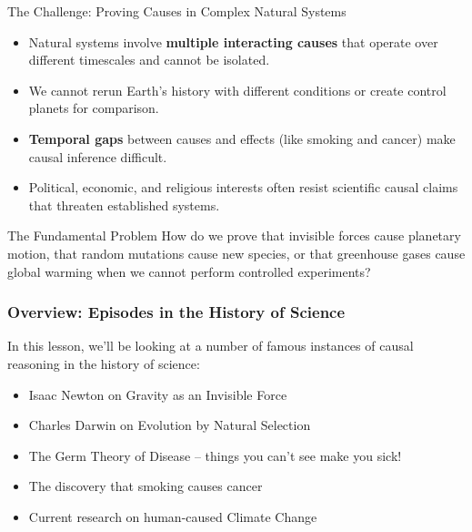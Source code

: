 \documentclass{beamer}
\begin{document}
	\begin{frame}{The Challenge: Proving Causes in Complex Natural Systems}
		\begin{itemize}
			\item Natural systems involve \textbf{multiple interacting causes} that operate over different timescales and cannot be isolated.
			\item We cannot rerun Earth's history with different conditions or create control planets for comparison.
			\item \textbf{Temporal gaps} between causes and effects (like smoking and cancer) make causal inference difficult.
			\item Political, economic, and religious interests often resist scientific causal claims that threaten established systems.
		\end{itemize}
		
		\begin{alertblock}{The Fundamental Problem}
			How do we prove that invisible forces cause planetary motion, that random mutations cause new species, or that greenhouse gases cause global warming when we cannot perform controlled experiments?
		\end{alertblock}
	\end{frame}
	
	\begin{frame}
		\frametitle{Overview: Episodes in the History of Science}
		In this lesson, we'll be looking at a number of famous instances of causal reasoning in the history of science:
		\begin{itemize}
			\item Isaac Newton on Gravity as an Invisible Force
			\item Charles Darwin on Evolution by Natural Selection
			\item The Germ Theory of Disease -- things you can't see make you sick!
			\item The discovery that smoking causes cancer
			\item Current research on human-caused Climate Change
		\end{itemize}
	\end{frame}
	
\end{document}
